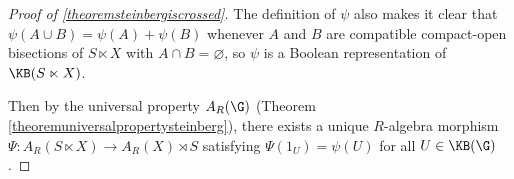 \begin{proof}[Proof of \ref{theoremsteinbergiscrossed}]
The definition of $\psi$ also makes it clear that $\psi(A\cup B)=\psi(A)+\psi(B)$ whenever $A$ and $B$ are compatible compact-open bisections of $S\ltimes X$ with $A\cap B=\varnothing$, so $\psi$ is a Boolean representation of $\KB(S\ltimes X)$.

Then by the universal property $A_R(\G)$ (Theorem \ref{theoremuniversalpropertysteinberg}), there exists a unique $R$-algebra morphism $\Psi:A_R(S\ltimes X)\to A_R(X)\rtimes S$ satisfying $\Psi(1_U)=\psi(U)$ for all $U\in\KB(\G)$. 
%
%


\end{proof}
